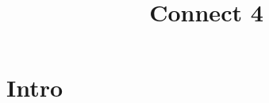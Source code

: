 \documentclass{article}
\title{Connect 4}
\begin{document}
  
\maketitle


\section{Intro}


\lipsum
  
\end{document}
